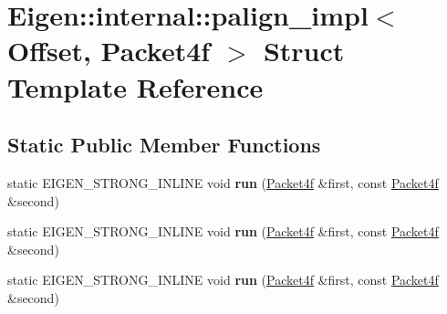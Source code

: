 \hypertarget{struct_eigen_1_1internal_1_1palign__impl_3_01_offset_00_01_packet4f_01_4}{}\section{Eigen\+:\+:internal\+:\+:palign\+\_\+impl$<$ Offset, Packet4f $>$ Struct Template Reference}
\label{struct_eigen_1_1internal_1_1palign__impl_3_01_offset_00_01_packet4f_01_4}
\subsection*{Static Public Member Functions}
\begin{DoxyCompactItemize}
\item 
\mbox{\label{struct_eigen_1_1internal_1_1palign__impl_3_01_offset_00_01_packet4f_01_4_a150fdb800bfa363cd70cc65dc9e524bc}} 
static E\+I\+G\+E\+N\+\_\+\+S\+T\+R\+O\+N\+G\+\_\+\+I\+N\+L\+I\+NE void {\bfseries run} (\hyperlink{struct_eigen_1_1internal_1_1_packet4f}{Packet4f} \&first, const \hyperlink{struct_eigen_1_1internal_1_1_packet4f}{Packet4f} \&second)
\item 
\mbox{\label{struct_eigen_1_1internal_1_1palign__impl_3_01_offset_00_01_packet4f_01_4_a150fdb800bfa363cd70cc65dc9e524bc}} 
static E\+I\+G\+E\+N\+\_\+\+S\+T\+R\+O\+N\+G\+\_\+\+I\+N\+L\+I\+NE void {\bfseries run} (\hyperlink{struct_eigen_1_1internal_1_1_packet4f}{Packet4f} \&first, const \hyperlink{struct_eigen_1_1internal_1_1_packet4f}{Packet4f} \&second)
\item 
\mbox{\label{struct_eigen_1_1internal_1_1palign__impl_3_01_offset_00_01_packet4f_01_4_a150fdb800bfa363cd70cc65dc9e524bc}} 
static E\+I\+G\+E\+N\+\_\+\+S\+T\+R\+O\+N\+G\+\_\+\+I\+N\+L\+I\+NE void {\bfseries run} (\hyperlink{struct_eigen_1_1internal_1_1_packet4f}{Packet4f} \&first, const \hyperlink{struct_eigen_1_1internal_1_1_packet4f}{Packet4f} \&second)
\item 
\mbox{\label{struct_eigen_1_1internal_1_1palign__impl_3_01_offset_00_01_packet4f_01_4_a150fdb800bfa363cd70cc65dc9e524bc}} 

\end{DoxyCompactItemize}
